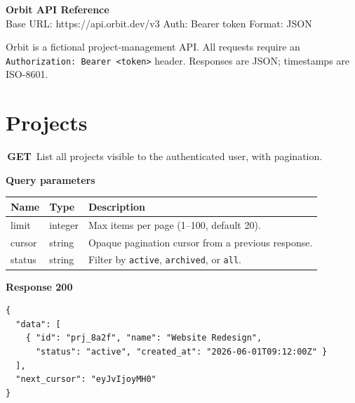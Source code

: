 \documentclass[11pt]{article}
\newcommand{\method}[2]{\colorbox{#2}{\color{white}\ttfamily\bfseries\small\,#1\,}}
\newcommand{\route}[1]{{\ttfamily\normalsize\color{ink} #1}}
\begin{document}
\begin{tcolorbox}[colback=ink,colframe=ink,arc=4pt,left=14pt,top=10pt,bottom=10pt]
{\color{white}\fontsize{20}{22}\selectfont\bfseries Orbit API Reference}\\[3pt]
{\color{accent!60}\small Base URL: \ttfamily https://api.orbit.dev/v3 \quad\textbullet\quad
 Auth: Bearer token \quad\textbullet\quad Format: JSON}
\end{tcolorbox}

\vspace{4pt}
Orbit is a fictional project-management API. All requests require an
\texttt{Authorization: Bearer <token>} header. Responses are JSON; timestamps are ISO-8601.

\section{Projects}

\begin{apicard}{\method{GET}{getc}\quad\route{/projects}}
List all projects visible to the authenticated user, with pagination.

\vspace{3pt}\textbf{Query parameters}
\begin{tabularx}{\linewidth}{@{}l l X@{}}
\toprule
\textbf{Name} & \textbf{Type} & \textbf{Description}\\
\midrule
\ttfamily limit  & integer & Max items per page (1--100, default 20).\\
\ttfamily cursor & string  & Opaque pagination cursor from a previous response.\\
\ttfamily status & string  & Filter by \texttt{active}, \texttt{archived}, or \texttt{all}.\\
\bottomrule
\end{tabularx}

\vspace{4pt}\textbf{Response 200}
\begin{lstlisting}
{
  "data": [
    { "id": "prj_8a2f", "name": "Website Redesign",
      "status": "active", "created_at": "2026-06-01T09:12:00Z" }
  ],
  "next_cursor": "eyJvIjoyMH0"
}
\end{lstlisting}
\end{apicard}
\end{document}
